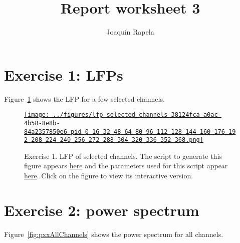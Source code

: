 \documentclass[12pt]{article}
\title{Report worksheet 3}
\author{Joaqu\'{i}n Rapela}
\begin{document}
\maketitle

\section*{Exercise 1: LFPs}

Figure~\ref{fig:lfpSelectedChannels1} shows the LFP for a few selected channels.


\begin{figure}[H]
    \begin{center}
        \href{https://www.gatsby.ucl.ac.uk/~rapela/neuroinformatics/2023/ws3/figures/lfp_selected_channels_38124fca-a0ac-4b58-8e8b-84a2357850e6_pid_0_16_32_48_64_80_96_112_128_144_160_176_192_208_224_240_256_272_288_304_320_336_352_368.html}{\texttt{[image: ../figures/lfp\_selected\_channels\_38124fca-a0ac-4b58-8e8b-84a2357850e6\_pid\_0\_16\_32\_48\_64\_80\_96\_112\_128\_144\_160\_176\_192\_208\_224\_240\_256\_272\_288\_304\_320\_336\_352\_368.png]}}
        \caption{Exercise 1. LFP of selected channels.
                The script to generate
                this figure appears
                \href{https://github.com/joacorapela/neuroinformatics23/blob/master/worksheets/ws3/mySolution/code/scripts/doPlotSomeChannelsLFPs.py}{here}
                and the parameters used for this script appear
                \href{https://github.com/joacorapela/neuroinformatics23/blob/master/worksheets/ws3/mySolution/code/scripts/doPlotSomeChannelsLFPs.csh}{here}.
                Click on the figure to view its interactive version.
                }

                \label{fig:lfpSelectedChannels1}

            \end{center}
        \end{figure}

\section*{Exercise 2: power spectrum}

Figure~\ref{fig:pxxAllChannels} shows the power spectrum for all
channels.
\end{document}
